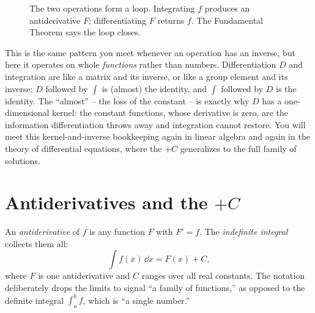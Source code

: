 \begin{figure}[H]
\centering
{}
\caption{The two operations form a loop. Integrating $f$ produces an
antiderivative $F$; differentiating $F$ returns $f$. The Fundamental Theorem says
the loop closes.}
\label{ch21:fig-loop}
\end{figure}

\begin{connectionbox}
This is the same pattern you meet whenever an operation has an inverse, but here
it operates on whole \emph{functions} rather than numbers. Differentiation $D$
and integration are like a matrix and its inverse, or like a group element and
its inverse: $D$ followed by $\int$ is (almost) the identity, and $\int$ followed
by $D$ is the identity. The ``almost'' -- the loss of the constant -- is exactly
why $D$ has a one-dimensional kernel: the constant functions, whose derivative is
zero, are the information differentiation throws away and integration cannot
restore. You will meet this kernel-and-inverse bookkeeping again in linear
algebra and again in the theory of differential equations, where the $+C$
generalizes to the full family of solutions.
\end{connectionbox}

\section{Antiderivatives and the $+C$}

An \emph{antiderivative} of $f$ is any function $F$ with $F'=f$. The
\emph{indefinite integral} collects them all:
\[
  \int f(x)\,\dd x = F(x) + C ,
\]
where $F$ is one antiderivative and $C$ ranges over all real constants. The
notation deliberately drops the limits to signal ``a family of functions,'' as
opposed to the definite integral $\int_a^b f$, which is ``a single number.''

